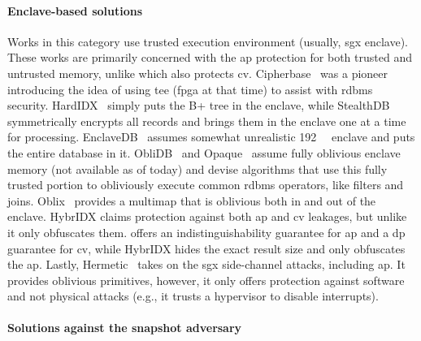 		\paragraph*{Enclave-based solutions}

			Works in this category use trusted execution environment (usually, \acrshort{sgx} enclave).
			These works are primarily concerned with the \acrshort{ap} protection for both trusted and untrusted memory, unlike \epsolute{} which also protects \acrshort{cv}.
			Cipherbase~\cite{cipherbase,cipherbase-daas} was a pioneer introducing the idea of using \acrshort{tee} (\acrshort{fpga} at that time) to assist with \acrshort{rdbms} security.
			HardIDX~\cite{hardidx} simply puts the B+ tree in the enclave, while StealthDB~\cite{stealth-db} symmetrically encrypts all records and brings them in the enclave one at a time for processing.
			EnclaveDB~\cite{enclave-db} assumes somewhat unrealistic \SI{192}{\giga\byte} enclave and puts the entire database in it.
			ObliDB~\cite{oblidb} and Opaque~\cite{opaque} assume fully oblivious enclave memory (not available as of today) and devise algorithms that use this fully trusted portion to obliviously execute common \acrshort{rdbms} operators, like filters and joins.
			Oblix~\cite{oblix} provides a multimap that is oblivious both in and out of the enclave.
			HybrIDX claims protection against both \acrshort{ap} and \acrshort{cv} leakages, but unlike \epsolute{} it only obfuscates them.
			\epsolute{} offers an indistinguishability guarantee for \acrshort{ap} and a \acrshort{dp} guarantee for \acrshort{cv}, while HybrIDX hides the exact result size and only obfuscates the \acrshort{ap}.
			Lastly, Hermetic~\cite{hermetic} takes on the \acrshort{sgx} side-channel attacks, including \acrshort{ap}.
			It provides oblivious primitives, however, it only offers protection against software and not physical attacks (e.g., it trusts a hypervisor to disable interrupts).

		\paragraph*{Solutions against the snapshot adversary}

